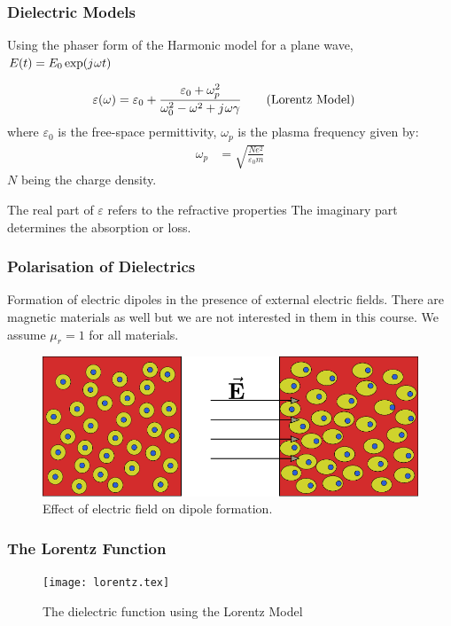 \documentclass[10pt, compress]{beamer}
\renewcommand{\O}{\omega}  %
\newcommand{\E}{\varepsilon}  %
\renewcommand{\u}{\mu}  %
\renewcommand{\j}{{j}\mkern1mu} %
\begin{document}
\begin{frame}
  \frametitle{Dielectric Models}
  \begin{outline}
    \1 Using the phaser form of the Harmonic model for a plane wave, $E(t) = E_0 \exp(\j \O t)$
  \end{outline}
  \begin{align*}
    \E(\O) &= \E_0 + \frac{\E_0 + \O_p^2}{\O_0^2 - \O^2 + \j \O \gamma} \tag{Lorentz Model}
  \end{align*}
  where $\E_0$ is the free-space permittivity, $\O_p$ is the plasma frequency given by:
  \begin{align*}
      \O_p &= \sqrt{\frac{Ne^2}{\E_0 m}}
  \end{align*}
  $N$ being the charge density. 
  \begin{outline}
    \1 The real part of $\E$ refers to the refractive properties
    \1 The imaginary part determines the absorption or loss.
  \end{outline}
\end{frame}

\begin{frame}
  \frametitle{Polarisation of Dielectrics}
  \begin{outline}
    \1 Formation of electric dipoles in the presence of external electric fields.
    \1 There are magnetic materials as well but we are not interested in them in this course.
    \2 We assume $\u_r = 1$ for all materials.
  \end{outline}
\begin{figure}
  \centering
  \includegraphics[scale=.6]{model.pdf}
  \caption{Effect of electric field on dipole formation.}
\end{figure}  
\end{frame}

\begin{frame}
  \frametitle{The Lorentz Function}
\begin{figure}[t!]
  \centering
        {\texttt{[image: lorentz.tex]}
        \label{fig:lorentz}}
        \caption{The dielectric function using the Lorentz Model}
      \end{figure}
\end{frame}
\end{document}
